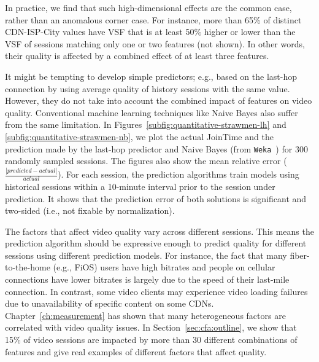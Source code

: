 In practice, we find that such high-dimensional effects 
are the common case, rather than an anomalous corner case.  
For instance, more than 65\% of distinct
CDN-ISP-City values have VSF that is at least 50\% higher or 
lower than the VSF of sessions matching only one or 
two features (not shown). In other words, their quality is
affected by a combined effect of at least three features.


It might be tempting to develop  simple predictors; 
e.g., based on the last-hop 
connection by using average quality of history sessions 
with the same \fConnectionType value.
However, they do not take into account the combined
impact of features on video quality.
Conventional machine learning techniques like Naive 
Bayes also suffer from the same limitation.
In Figures~\ref{subfig:quantitative-strawmen-lh} and 
\ref{subfig:quantitative-strawmen-nb},
we plot the actual JoinTime and the prediction
made by the last-hop predictor and Naive Bayes 
(from \texttt{Weka}~\cite{weka})
for 300 randomly sampled sessions.
The figures also show the mean relative error (
$\frac{|predicted-actual|}{actual}$).
For each session, the prediction algorithms train 
models using historical sessions within a 10-minute 
interval prior to the session under prediction.
It shows that the prediction error of both solutions is 
significant and two-sided (i.e., not fixable by
normalization).


The factors that affect video quality vary across different sessions.
This means the prediction algorithm should be expressive enough
to predict quality for different sessions using 
different prediction models.
For instance, the fact that many fiber-to-the-home (e.g., FiOS) 
users have high bitrates and people on 
 cellular connections have lower bitrates is largely due to 
the speed of their last-mile connection. In contrast, some video clients 
may experience video loading failures due to 
unavailability of specific content on some CDNs.
Chapter~\ref{ch:measurement}
has shown that many heterogeneous 
factors are correlated with video quality issues.
In Section~\ref{sec:cfa:outline}, we show  that 15\% of video 
sessions are impacted by more than 30 different combinations 
of features and give real examples of different factors that 
affect quality.


